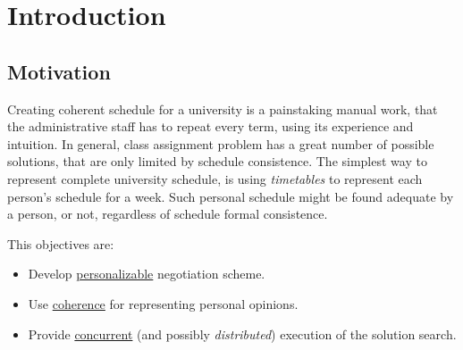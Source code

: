\documentclass[header]{subfiles}
\begin{document}
\chapter{Introduction}

%
%
%
%

\section{Motivation}
Creating coherent schedule for a university is a painstaking manual work, that
the administrative staff has to repeat every term, using its experience and
intuition. In general, class assignment problem has a great number of possible
solutions, that are only limited by schedule consistence. The simplest way to
represent complete university schedule, is using \emph{timetables} to represent
each person's schedule for a week. Such personal schedule might be found adequate
by a person, or not, regardless of schedule formal consistence.

\bigskip\noindent
This \thisdoc objectives are:
\begin{itemize}
  \item Develop \underline{personalizable} negotiation scheme.
  \item Use \underline{coherence} for representing personal opinions.
  \item Provide \underline{concurrent} (and possibly \emph{distributed}) execution
        of the solution search.
\end{itemize}

\end{document}
